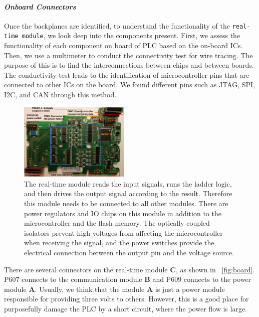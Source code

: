 \paragraph{\textbf{\textit{Onboard Connectors}}} Once the backplanes are identified, to understand the functionality of the \texttt{real-time module}, we look deep into the components present. First, we assess the functionality of each component on board of PLC based on the on-board ICs. Then, we use a multimeter to conduct the connectivity test for wire tracing. The purpose of this is to find the interconnections between chips and between boards. The conductivity test leads to the identification of microcontroller pins that are connected to other ICs on the board. We found different pins such as JTAG, SPI, I2C, and CAN through this method. %

\begin{figure}[tp!]
	\includegraphics[width=0.47\textwidth]{figures/board3}
	\centering
	\caption{The real-time module reads the input signals, runs the ladder logic, and then drives the output signal according to the result. Therefore this module needs to be connected to all other modules. There are power regulators and IO chips on this module in addition to the microcontroller and the flash memory. The optically coupled isolators prevent high voltages from affecting the microcontroller when receiving the signal, and the power switches provide the electrical connection between the output pin and the voltage source.}
	\label{fig:board}
\end{figure}

There are several connectors on the real-time module \textbf{C}, as shown in ~\autoref{fig:board}. P607 connects to the communication module \textbf{B} and P609 connects to the power module \textbf{A}. Usually, we think that the module \textbf{A} is just a power module responsible for providing three volts to others. However, this is a good place for purposefully damage the PLC by a short circuit, where the power flow is large.


